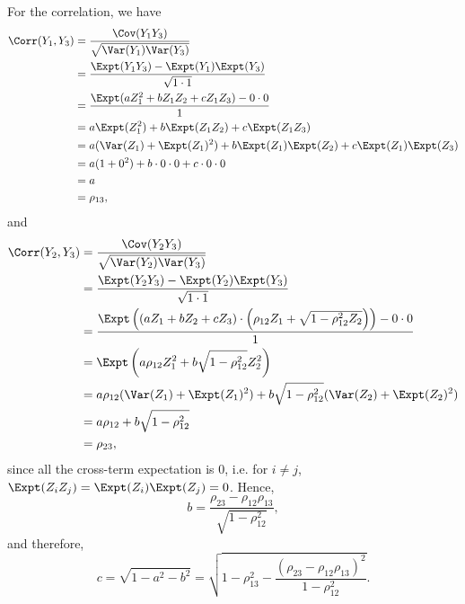 For the correlation, we have
\begin{align*}
    \Corr(Y_1, Y_3) & = \frac{\Cov(Y_1 Y_3)}{\sqrt{\Var(Y_1) \Var(Y_3)}}                                 \\
                    & = \frac{\Expt(Y_1 Y_3) - \Expt(Y_1) \Expt(Y_3)}{\sqrt{1 \cdot 1}}                  \\
                    & = \frac{\Expt(aZ_1^2 + bZ_1Z_2 + cZ_1Z_3) - 0 \cdot 0}{1}                          \\
                    & = a\Expt(Z_1^2) + b\Expt(Z_1 Z_2) + c\Expt(Z_1 Z_3)                                \\
                    & = a (\Var(Z_1) + \Expt(Z_1)^2) + b \Expt(Z_1) \Expt(Z_2) + c \Expt(Z_1) \Expt(Z_3) \\
                    & = a (1 + 0^2) + b \cdot 0 \cdot 0 + c \cdot 0 \cdot 0                              \\
                    & = a                                                                                \\
                    & = \rho_{13},
\end{align*}
and
\begin{align*}
    \Corr(Y_2, Y_3) & = \frac{\Cov(Y_2 Y_3)}{\sqrt{\Var(Y_2) \Var(Y_3)}}                                                                           \\
                    & = \frac{\Expt(Y_2 Y_3) - \Expt(Y_2) \Expt(Y_3)}{\sqrt{1 \cdot 1}}                                                            \\
                    & = \frac{\Expt\left((aZ_1 + bZ_2 + cZ_3) \cdot \left(\rho_{12} Z_1 + \sqrt{1 - \rho_{12}^2 Z_2}\right)\right) - 0 \cdot 0}{1} \\
                    & = \Expt\left(a\rho_{12}Z_1^2 + b\sqrt{1 - \rho_{12}^2} Z_2^2\right)                                                          \\
                    & = a \rho_{12} (\Var(Z_1) + \Expt(Z_1)^2) + b\sqrt{1 - \rho_{12}^2} (\Var(Z_2) + \Expt(Z_2)^2)                                \\
                    & = a \rho_{12} + b\sqrt{1 - \rho_{12}^2}                                                                                      \\
                    & = \rho_{23},
\end{align*}
since all the cross-term expectation is \(0\), i.e. for \(i \neq j\), \(\Expt(Z_i Z_j) = \Expt(Z_i) \Expt(Z_j) = 0\). Hence,
\[
    b = \frac{\rho_{23} - \rho_{12} \rho_{13}}{\sqrt{1 - \rho_{12}^2}},
\]
and therefore,
\[
    c = \sqrt{1 - a^2 - b^2} = \sqrt{1 - \rho_{13}^2 - \frac{\left(\rho_{23} - \rho_{12} \rho_{13}\right)^2}{1 - \rho_{12}^2}}.
\]

